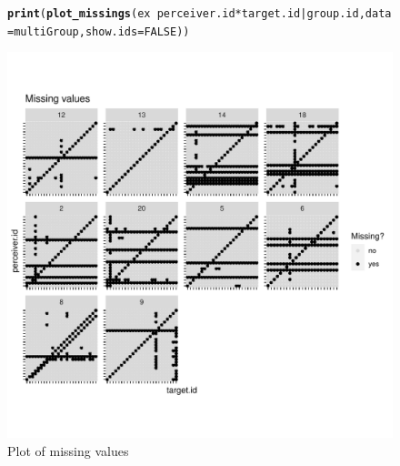 \documentclass[a4paper]{article}\usepackage[]{graphicx}\usepackage[]{color}
\makeatletter
\def\maxwidth{ %
  \ifdim\Gin@nat@width>\linewidth
    \linewidth
  \else
    \Gin@nat@width
  \fi
}
\newcommand{\hlnum}[1]{\textcolor[rgb]{0.686,0.059,0.569}{#1}}%
\newcommand{\hlopt}[1]{\textcolor[rgb]{0,0,0}{#1}}%
\newcommand{\hlstd}[1]{\textcolor[rgb]{0.345,0.345,0.345}{#1}}%
\newcommand{\hlkwc}[1]{\textcolor[rgb]{0.333,0.667,0.333}{#1}}%
\newcommand{\hlkwd}[1]{\textcolor[rgb]{0.737,0.353,0.396}{\textbf{#1}}}%
\newenvironment{kframe}{%
 \def\at@end@of@kframe{}%
 \ifinner\ifhmode%
  \def\at@end@of@kframe{\end{minipage}}%
  \begin{minipage}{\columnwidth}%
 \fi\fi%
 \def\FrameCommand##1{\hskip\@totalleftmargin \hskip-\fboxsep
 \colorbox{shadecolor}{##1}\hskip-\fboxsep
     \hskip-\linewidth \hskip-\@totalleftmargin \hskip\columnwidth}%
 \MakeFramed {\advance\hsize-\width
   \@totalleftmargin\z@ \linewidth\hsize
   \@setminipage}}%
 {\par\unskip\endMakeFramed%
 \at@end@of@kframe}
\newenvironment{knitrout}{}{} %
\makeatother
\begin{document}
\begin{figure} 
\begin{center} 
\begin{knitrout}\small
{}\color{fgcolor}\begin{kframe}
\begin{alltt}
\hlkwd{print}\hlstd{(}\hlkwd{plot_missings}\hlstd{(ex} \hlopt{~} \hlstd{perceiver.id} \hlopt{*} \hlstd{target.id} \hlopt{|} \hlstd{group.id,} \hlkwc{data} \hlstd{= multiGroup,} \hlkwc{show.ids} \hlstd{=} \hlnum{FALSE}\hlstd{))}
\end{alltt}
\end{kframe}
\includegraphics[width=\maxwidth]{Sweave-Files/Sw_unnamed-chunk-16-1} 
\end{knitrout}
\end{center}
\caption{Plot of missing values}
\label{fig:pmiss}
\end{figure}
\end{document}
